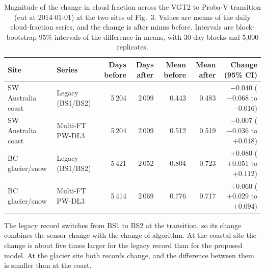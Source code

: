 \begin{table}[h]
\centering
\caption{Magnitude of the change in cloud fraction across the VGT2 to Proba-V transition (cut at 2014-01-01) at the two sites of Fig.~3. Values are means of the daily cloud-fraction series, and the change is after minus before. Intervals are block-bootstrap 95\% intervals of the difference in means, with 30-day blocks and 5,000 replicates.}
\label{tab:discontinuity}
\small
\setlength{\tabcolsep}{5pt}
\begin{tabular}{llrrrrr}
\toprule
Site & Series & Days before & Days after & Mean before & Mean after & Change (95\% CI) \\
\midrule
SW Australia coast & Legacy (BS1/BS2) & 5\,204 & 2\,009 & 0.443 & 0.483 & $-0.040$ ($-0.068$ to $-0.016$) \\
SW Australia coast & Multi-FT PW-DL3   & 5\,204 & 2\,009 & 0.512 & 0.519 & $-0.007$ ($-0.036$ to $+0.018$) \\
BC glacier/snow     & Legacy (BS1/BS2) & 5\,421 & 2\,052 & 0.804 & 0.723 & $+0.080$ ($+0.051$ to $+0.112$) \\
BC glacier/snow     & Multi-FT PW-DL3   & 5\,414 & 2\,069 & 0.776 & 0.717 & $+0.060$ ($+0.029$ to $+0.094$) \\
\bottomrule
\end{tabular}

\vspace{6pt}
\parbox{0.95\textwidth}{\footnotesize The legacy record switches from BS1 to BS2 at the transition, so its change combines the sensor change with the change of algorithm. At the coastal site the change is about five times larger for the legacy record than for the proposed model. At the glacier site both records change, and the difference between them is smaller than at the coast.}
\end{table}
